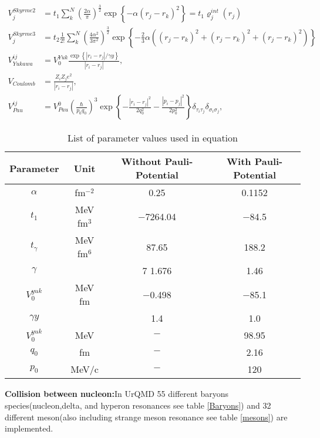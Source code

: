 \begin{align}
	V^{Skyrme2}_j&=t_1\sum_{k}^{N}\left(\frac{2\alpha}{\pi}\right)^\frac{3}{2}\exp\left\{-\alpha(r_j-r_k)^2\right\}=t_1\varrho_j^{int}(r_j)\\
	V^{Skyrme3}_j&= t_2\frac{1}{2!}\sum_{k}^{N}\left(\frac{4\alpha^2}{3\pi^2}\right)^\frac{3}{2}\!\!\exp\left\{-\frac{2}{3}\alpha\left((r_j-r_k)^2+(r_j-r_k)^2+(r_j-r_k)^2\right)\right\}\\
	V_{Yukawa}^{ij}&=V_0^{Yuk}\frac{\exp \left\{\left|r_i-r_j\right|/\gamma y\right\}}{\left|r_i-r_j\right|},\\
	V_{Coulomb}&=\frac{Z_iZ_je^2}{\left|r_i-r_j\right|},\\
	V_{Pau}^{ij}&=V_{Pau}^0\left(\frac{\hbar}{p_0q_0}\right)^3 \exp \left\{-\frac{\left|r_i-r_j\right|^2}{2 q_0^2}-\frac{\left|p_i-p_j\right|^2}{2 p_0^2}\right\}\delta_{\tau_i\tau_j}\delta_{\sigma_i\sigma_j},
\end{align}
\begin{table}
	\centering
	\caption{List of parameter values used in equation}
	\begin{tabular}{|c|c||cc|}
		\hline
		Parameter& Unit & Without Pauli-Potential & With Pauli-Potential\\
		\hline
		\hline
		$\alpha$&fm$^{-2}$ &0.25 &0.1152\\
		$t_1$&MeV fm$^{3}$  &$-$7264.04 &$-$84.5\\
		$t_\gamma$&MeV fm$^{6}$  &87.65& 188.2\\
		$\gamma$&  &7 1.676 &1.46\\
		$V_0^{yuk}$&MeV fm &$-$0.498&$-$85.1\\
		$\gamma y$& &1.4 &1.0\\
		$V_0^{yuk}$&MeV &$-$&98.95\\
		$q_0$& fm&$-$&2.16\\
		$p_0$&MeV$/$c &$-$&120\\
		\hline
		\hline
	\end{tabular}
\end{table}
\textbf{Collision between nucleon:}In UrQMD 55 different baryons species(nucleon,delta, and hyperon resonances see table \ref{Baryons}) and 32 different meson(also including strange meson resonance see table \ref{mesons}) are implemented. 
